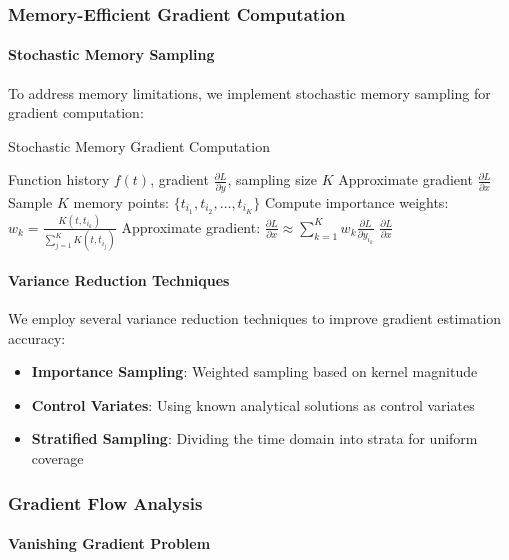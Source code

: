 \subsubsection{Memory-Efficient Gradient Computation}

\paragraph{Stochastic Memory Sampling}

To address memory limitations, we implement stochastic memory sampling for gradient computation:

\begin{algorithm}[h]
\caption{Stochastic Memory Gradient Computation}
\begin{algorithmic}[1]
\Require Function history $f(t)$, gradient $\frac{\partial L}{\partial y}$, sampling size $K$
\Ensure Approximate gradient $\frac{\partial L}{\partial x}$
\State Sample $K$ memory points: $\{t_{i_1}, t_{i_2}, \ldots, t_{i_K}\}$
\State Compute importance weights: $w_k = \frac{K(t, t_{i_k})}{\sum_{j=1}^K K(t, t_{i_j})}$
\State Approximate gradient: $\frac{\partial L}{\partial x} \approx \sum_{k=1}^K w_k \frac{\partial L}{\partial y_{i_k}}$
\Return $\frac{\partial L}{\partial x}$
\end{algorithmic}
\end{algorithm}

\paragraph{Variance Reduction Techniques}

We employ several variance reduction techniques to improve gradient estimation accuracy:
\begin{itemize}
\item \textbf{Importance Sampling}: Weighted sampling based on kernel magnitude
\item \textbf{Control Variates}: Using known analytical solutions as control variates
\item \textbf{Stratified Sampling}: Dividing the time domain into strata for uniform coverage
\end{itemize}

\subsubsection{Gradient Flow Analysis}

\paragraph{Vanishing Gradient Problem}

